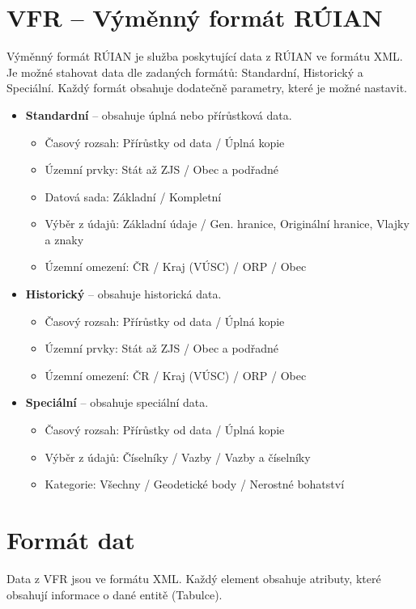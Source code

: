 \documentclass[czech, kiv, ba, he, iso690alph, pdf]{fasthesis}
\begin{document}
\section{VFR -- Výměnný formát RÚIAN}
Výměnný formát RÚIAN je služba poskytující data z RÚIAN ve formátu XML.
Je možné stahovat data dle zadaných formátů: Standardní, Historický a Speciální.
Každý formát obsahuje dodatečně parametry, které je možné nastavit.
\pagebreak
\begin {itemize}
    \item \textbf{Standardní} -- obsahuje úplná nebo přírůstková data.
    \begin {itemize}
        \item Časový rozsah: Přírůstky od data / Úplná kopie
        \item Územní prvky: Stát až ZJS / Obec a podřadné
        \item Datová sada: Základní / Kompletní
        \item Výběr z údajů: Základní údaje / Gen. hranice, Originální hranice, Vlajky a znaky
        \item Územní omezení: ČR / Kraj (VÚSC) / ORP / Obec
    \end {itemize}
    \item \textbf{Historický} -- obsahuje historická data.
    \begin {itemize}
        \item Časový rozsah: Přírůstky od data / Úplná kopie
        \item Územní prvky: Stát až ZJS / Obec a podřadné
        \item Územní omezení: ČR / Kraj (VÚSC) / ORP / Obec
    \end {itemize}
    \item \textbf{Speciální} -- obsahuje speciální data.
    \begin {itemize}
        \item Časový rozsah: Přírůstky od data / Úplná kopie
        \item Výběr z údajů: Číselníky / Vazby / Vazby a číselníky
        \item Kategorie: Všechny / Geodetické body / Nerostné bohatství
    \end {itemize}
\end {itemize}

\section{Formát dat}
Data z VFR jsou ve formátu XML.
Každý element obsahuje atributy, které obsahují informace o dané entitě (Tabulce).
\end{document}
